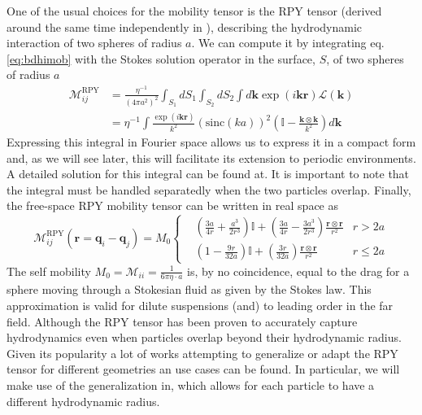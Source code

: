 \documentclass[ twoside,openright,titlepage,numbers=noenddot,%
headinclude,footinclude,cleardoublepage=empty,abstract=on,
BCOR=5mm,paper=a4,fontsize=11pt, dvipsnames
]{scrreprt}
\renewcommand{\vec}[1]{\bm{#1}}
\newcommand{\tens}[1]{\bm{\mathcal{#1}}}
\newcommand{\oper}[1]{\mathcal{#1}}
\newcommand{\sinc}{\textrm{sinc}}
\begin{document}
One of the usual choices for the mobility tensor is the \gls{RPY} tensor (derived around the same time independently in \cite{Rotne1969,Yamakawa1970}), describing the hydrodynamic interaction of two spheres of radius $a$. We can compute it by integrating eq. \eqref{eq:bdhimob} with the Stokes solution operator in the surface, $S$, of two spheres of radius $a$
\begin{equation}
  \label{eq:rpymobfour}
  \begin{aligned}
    \tens{M}_{ij}^{\textrm{RPY}} &= \frac{\eta^{-1}}{(4\pi a^2)^2} \int_{S_1}dS_1\int_{S_2}dS_2 \int d\vec{k} \exp(i\vec{k}\vec{r})\hat{\oper{L}}(\vec{k})\\
    &= \eta^{-1} \int \frac{\exp(i\vec{k}\vec{r})}{k^2}\left(\sinc(ka) \right)^2\left(\mathbb{I} - \frac{\vec{k}\otimes\vec{k}}{k^2}\right)d\vec{k}
\end{aligned}
\end{equation}
Expressing this integral in Fourier space allows us to express it in a compact form and, as we will see later, this will facilitate its extension to periodic environments.
A detailed solution for this integral can be found at\cite{Wajnryb2013}. It is important to note that the integral must be handled separatedly when the two particles overlap.
Finally, the free-space \gls{RPY} mobility tensor can be written in real space as\cite{Wajnryb2013}
\begin{equation}
  \label{eq:rpy}
  \tens{M}^{\textrm{RPY}}_{ij}(\vec{r} = \vec{q}_i-\vec{q}_j) = M_0\left\{
  \begin{aligned}
    &\left( \frac{3a}{4r} + \frac{a^3}{2r^3} \right)\mathbb{I} + \left(\frac{3a}{4r} - \frac{3a^3}{2r^3}\right)\frac{\vec{r}\otimes\vec{r}}{r^2}  & r > 2a\\
    &\left(1 - \frac{9r}{32a} \right)\mathbb{I} + \left( \frac{3r}{32a} \right)\frac{\vec{r}\otimes\vec{r}}{r^2} & r \le 2a
  \end{aligned}\right.
\end{equation}
The self mobility $M_0 = \tens{M}_{ii} = \frac{1}{6\pi\eta·a}$ is, by no coincidence, equal to the drag for a sphere moving through a Stokesian fluid as given by the Stokes law\cite{Dhont1996}.
This approximation is valid for dilute suspensions (and) to leading order in the far field. Although the \gls{RPY} tensor has been proven to accurately capture hydrodynamics even when particles overlap beyond their hydrodynamic radius\cite{Ermak1978}\cite{Wajnryb2013}.
Given its popularity a lot of works attempting to generalize or adapt the \gls{RPY} tensor for different geometries an use cases can be found\cite{Wajnryb2013,Liang2013,Guan2018,Fiore2017}. In particular, we will make use of the generalization in\cite{Zuk2014}, which allows for each particle to have a different hydrodynamic radius.
\end{document}
